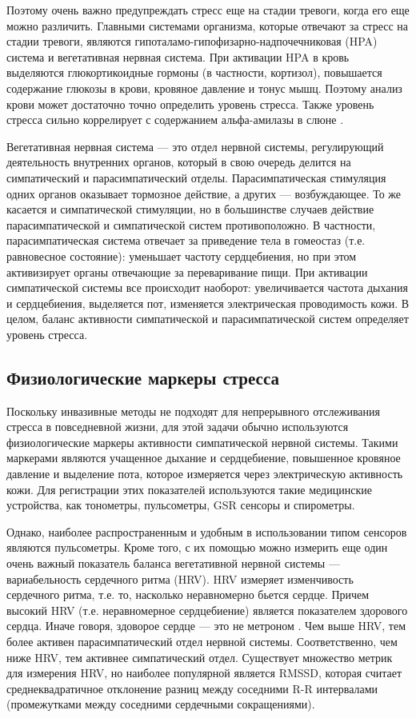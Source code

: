 \documentclass[14pt]{matmex-diploma-custom}
\begin{document}
Поэтому очень важно предупреждать стресс еще на стадии тревоги, когда его еще
можно различить. Главными системами организма, которые отвечают за стресс на
стадии тревоги, являются гипоталамо-гипофизарно-надпочечниковая (HPA) система и
вегетативная нервная система. При активации HPA в кровь выделяются
глюкортикоидные гормоны (в частности, кортизол), повышается содержание глюкозы в
крови, кровяное давление и тонус мышц. Поэтому анализ крови может достаточно
точно определить уровень стресса. Также уровень стресса сильно коррелирует с
содержанием альфа-амилазы в слюне \cite{article:alpha_amylase}.

Вегетативная нервная система --- это отдел нервной системы, регулирующий
деятельность внутренних органов, который в свою очередь делится на симпатический
и парасимпатический отделы. Парасимпатическая стимуляция одних органов оказывает
тормозное действие, а других --- возбуждающее. То же касается и симпатической
стимуляции, но в большинстве случаев действие парасимпатической и симпатической
систем противоположно. В частности, парасимпатическая система отвечает за
приведение тела в гомеостаз (т.е. равновесное состояние): уменьшает частоту
сердцебиения, но при этом активизирует органы отвечающие за переваривание пищи.
При активации симпатической системы все происходит наоборот: увеличивается
частота дыхания и сердцебиения, выделяется пот, изменяется электрическая
проводимость кожи. В целом, баланс активности симпатической и парасимпатической
систем определяет уровень стресса.

\subsection{Физиологические маркеры стресса}
Поскольку инвазивные методы не подходят для непрерывного отслеживания стресса в
повседневной жизни, для этой задачи обычно используются физиологические маркеры
активности симпатической нервной системы. Такими маркерами являются учащенное
дыхание и сердцебиение, повышенное кровяное давление и выделение пота, которое
измеряется через электрическую активность кожи. Для регистрации этих показателей
используются такие медицинские устройства, как тонометры, пульсометры, GSR
сенсоры и спирометры.

Однако, наиболее распространенным и удобным в использовании типом сенсоров
являются пульсометры. Кроме того, с их помощью можно измерить еще один очень
важный показатель баланса вегетативной нервной системы --- вариабельность
сердечного ритма (HRV). HRV измеряет изменчивость сердечного ритма, т.е. то,
насколько неравномерно бьется сердце. Причем высокий HRV (т.е. неравномерное
сердцебиение) является показателем здорового сердца. Иначе говоря, здоворое
сердце --- это не метроном \cite{article:not_metronome}. Чем выше HRV, тем более
активен парасимпатический отдел нервной системы. Соответственно, чем ниже HRV,
тем активнее симпатический отдел. Существует множество метрик для измерения HRV,
но наиболее популярной является RMSSD, которая считает
среднеквадратичное отклонение разниц между соседними R-R интервалами
(промежутками между соседними сердечными сокращениями).
\end{document}
